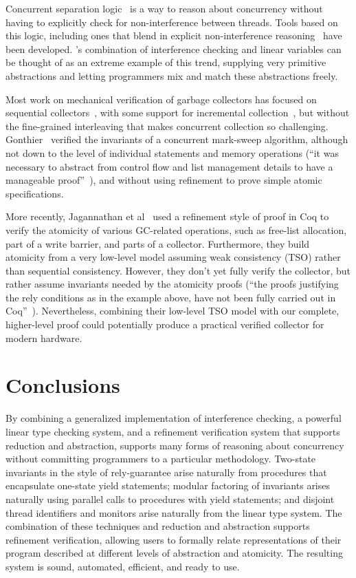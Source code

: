 Concurrent separation logic~\cite{OHearn07} is a way to reason about concurrency without having to 
explicitly check for non-interference between threads. 
Tools based on this logic, including ones that blend in explicit non-interference reasoning~\cite{SAGL,RGSep} have been developed. 
\civl's combination of interference checking and linear variables can be thought of as an extreme example of this trend, 
supplying very primitive abstractions and letting programmers mix and match these abstractions freely.

Most work on mechanical verification of garbage collectors has focused on sequential collectors~\cite{mccr07,hawb09},
with some support for incremental collection~\cite{mccr07},
but without the fine-grained interleaving that makes concurrent collection so challenging.
Gonthier~\cite{gont96} verified the invariants of a concurrent mark-sweep algorithm,
although not down to the level of individual statements and memory operations
(``it was necessary to abstract from control flow and list management details to have a manageable proof''~\cite{gont96}),
and without using refinement to prove simple atomic specifications.

More recently,
Jagannathan et al~\cite{Jagannathan14} used a refinement style of proof in Coq to verify the atomicity of various GC-related operations,
such as free-list allocation,
part of a write barrier, and parts of a collector.
Furthermore, they build atomicity from a very low-level model assuming weak consistency (TSO) rather than sequential consistency.
However, they don't yet fully verify the collector,
but rather assume invariants needed by the atomicity proofs
(``the proofs justifying the rely conditions as in the example above,
have not been fully carried out in Coq''~\cite{Jagannathan14}).
Nevertheless, combining their low-level TSO model with our complete,
higher-level proof could potentially produce a practical verified collector for modern hardware.

\section{Conclusions}

By combining a generalized implementation of interference checking, a powerful linear type checking system, and a refinement verification system that supports reduction and abstraction, 
\civl supports many forms of reasoning about concurrency without committing programmers to a particular methodology.
Two-state invariants in the style of rely-guarantee arise naturally from procedures that encapsulate one-state yield statements;
modular factoring of invariants arises naturally using parallel calls to procedures with yield statements;
and disjoint thread identifiers and monitors arise naturally from the linear type system. The combination of these techniques and reduction and abstraction supports refinement verification, allowing users to formally relate representations of their program described at different levels of abstraction and atomicity. 
The resulting system is sound, automated, efficient, and ready to use.

